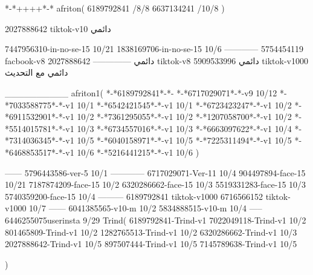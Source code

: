 *-*++++*-*
afriton(
6189792841 /8/8
6637134241 /10/8
)

2027888642 tiktok-v10
دائمي


7447956310-in-no-se-15 10/21
1838169706-in-no-se-15 10/6
------------
5754454119 facbook-v8
دائمي
--------------
2027888642 tiktok-v8
دائمي
5909533996 tiktok-v1000
دائمي مع التحديث

__________
afriton1(
*-*6189792841*-*-
*-*6717029071*-*-v9 10/12
*-*7033588775*-*-v1 10/1
*-*6542421545*-*-v1 10/1
*-*6723423247*-*-v1 10/2
*-*6911532901*-*-v1 10/2
*-*7361295055*-*-v1 10/2
*-*1207058700*-*-v1 10/2
*-*5514015781*-*-v1 10/3
*-*6734557016*-*-v1 10/3
*-*6663097622*-*-v1 10/4
*-*7314036345*-*-v1 10/5
*-*6040158971*-*-v1 10/5
*-*7225311494*-*-v1 10/5
*-*6468853517*-*-v1 10/6
*-*5216441215*-*-v1 10/6
)

------
5796443586-ver-5 10/1
------------
6717029071-Ver-11
10/4
904497894-face-15 10/21
7187874209-face-15 10/2
6320286662-face-15 10/3
5519331283-face-15 10/3
5740359200-face-15 10/4
---------
6189792841 tiktok-v1000
6716566152 tiktok-v1000
10/7
------
6041385565-v10-m 10/2
5834888515-v10-m 10/4
-----
6446255075userinsta 9/29
Trind(
6189792841-Trind-v1 
7022049118-Trind-v1 10/2
801465809-Trind-v1 10/2
1282765513-Trind-v1 10/2
6320286662-Trind-v1 10/3
2027888642-Trind-v1 10/5
897507444-Trind-v1 10/5
7145789638-Trind-v1 10/5

)
